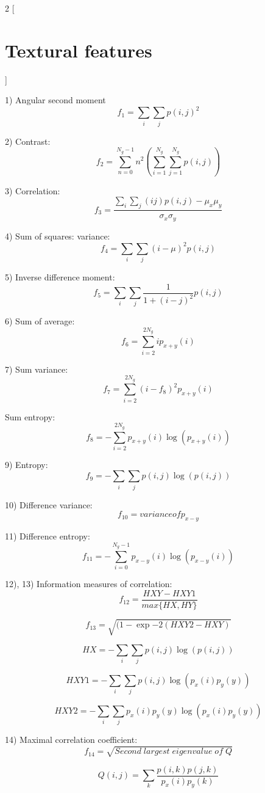\documentclass[8pt]{article}
\begin{document}
\begin{multicols}{2}
[
\section{Textural features}
]

1) Angular second moment
\[
f_1 = \sum_{i}\sum_{j}p(i,j)^2
\]

2) Contrast: 
\[
f_2 = \sum_{n=0}^{N_g-1}n^2 \left( \sum_{i=1}^{N_g}\sum_{j=1}^{N_g}p(i,j) \right)
\]

3) Correlation:
\[
f_3 = \frac{\sum_i\sum_j\left(ij\right)p(i,j) - \mu_x\mu_y}{\sigma_x\sigma_y}
\]

4) Sum of squares: variance: 
\[
f_4 = \sum_i\sum_j(i-\mu)^2p(i,j)
\]

5) Inverse difference moment:
\[
f_5 = \sum_i\sum_j \frac{1}{1+(i-j)^2}p(i,j)
\]

6) Sum of average:
\[
f_6 = \sum_{i=2}^{2N_g}ip_{x+y}(i)
\]

7) Sum variance: 
\[
f_7 = \sum_{i=2}^{2N_g}(i-f_8)^2p_{x+y}(i)
\]

Sum entropy: 
\[
f_8 = -\sum_{i=2}^{2N_g}p_{x+y}(i)\log(p_{x+y}(i))
\]

9) Entropy:
\[
f_9 = -\sum_i\sum_j p(i,j)\log(p(i,j))
\]

10) Difference variance:
\[
f_{10} = variance of p_{x-y}
\]

11) Difference entropy: 
\[
f_{11} = -\sum_{i=0}^{N_g-1}p_{x-y}(i)\log(p_{x-y}(i)) 
\]

12), 13) Information measures of correlation:
\[
f_{12} = \frac{HXY - HXY1}{max\{HX,HY\}}
\]

\[
f_{13} = \sqrt{(1-\exp{-2(HXY2 - HXY)}}
\]

\[
HX = -\sum_i\sum_j p(i,j)\log(p(i,j))
\]

\[
HXY1 = -\sum_i\sum_j p(i,j)\log(p_x(i)p_y(y))
\]

\[
HXY2 = -\sum_i\sum_j p_x(i)p_y(y) \log(p_x(i)p_y(y))
\]

14) Maximal correlation coefficient:
\[
f_{14} = \sqrt{Second \; largest \; eigenvalue \; of \; Q}
\]

\[
Q(i,j) = \sum_k \frac{p(i,k)p(j,k)}{p_x(i)p_y(k)}
\]

\end{multicols}
\end{document}
